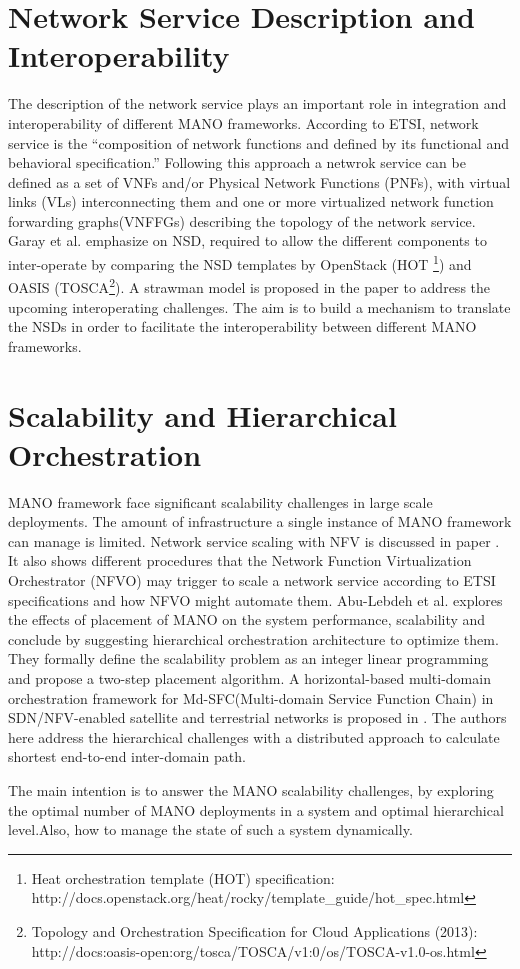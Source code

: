 \section{Network Service Description and Interoperability}
\label{serviceDescription}
The description of the network service plays an important role in integration and interoperability of different MANO frameworks. According to ETSI, network service is the “composition of network functions and defined by its functional and behavioral specification.” Following this approach a netwrok service can be defined as a set of VNFs and/or Physical Network Functions (PNFs), with virtual links (VLs) interconnecting them and one or more virtualized network function forwarding graphs(VNFFGs) describing the topology of the network service.\\

Garay et al. \cite{garay_service_2016} emphasize on NSD, required to allow the different components to inter-operate by comparing the NSD templates by OpenStack (HOT \footnote{Heat orchestration template (HOT) specification:        \\http://docs.openstack.org/heat/rocky/template\_guide/hot\_spec.html}) and OASIS (TOSCA\footnote{Topology and Orchestration Specification for Cloud Applications (2013):\\ http://docs:oasis-open:org/tosca/TOSCA/v1:0/os/TOSCA-v1.0-os.html}). A strawman model is proposed in the paper to address the upcoming interoperating challenges. The aim is to build a mechanism to translate the NSDs in order to facilitate the interoperability between different MANO frameworks.




\section{Scalability and Hierarchical Orchestration}
\label{manoscale}

MANO framework face significant scalability challenges in large scale deployments. The amount of infrastructure a single instance of MANO framework can manage is limited. Network service scaling with NFV is discussed in paper \cite{adamuz2018automated}. It also shows different procedures that the Network Function Virtualization Orchestrator (NFVO) may trigger to scale a network service according to ETSI specifications and how NFVO might automate them. Abu-Lebdeh et al. \cite{abu-lebdeh_nfv_2017} explores the effects of placement of MANO on the system performance, scalability and conclude by suggesting hierarchical orchestration architecture to optimize them. They formally define the scalability problem as an integer linear programming and propose a two-step placement algorithm. 
A horizontal-based multi-domain orchestration framework for  Md-SFC(Multi-domain Service Function Chain) in SDN/NFV-enabled satellite and terrestrial networks is proposed in \cite{li_horizontal-based_2018}. The authors here address the hierarchical challenges with a distributed approach to calculate shortest end-to-end inter-domain path.  

The main intention is to answer the MANO scalability challenges, by exploring the optimal number of MANO deployments in a system and optimal hierarchical level.Also, how to manage the state of such a system dynamically.
